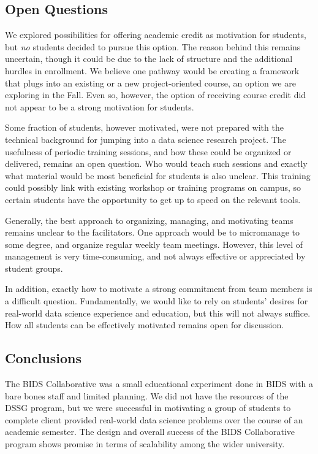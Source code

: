 \documentclass{sig-alternate}
\begin{document}
\subsection{Open Questions}

We explored possibilities for offering academic credit as motivation for students, but \emph{no} students decided to pursue this option. The reason behind this remains uncertain, though it could be due to the lack of structure and the additional hurdles in enrollment. We believe one pathway would be creating a framework that plugs into an existing or a new project-oriented course, an option we are exploring in the Fall.  Even so, however, the option of receiving course credit did not appear to be a strong motivation for students.

Some fraction of students, however motivated, were not prepared with the technical background for jumping into a data science research project.  The usefulness of periodic training sessions, and how these could be organized or delivered, remains an open question.  Who would teach such sessions and exactly what material would be most beneficial for students is also unclear.  This training could possibly link with existing workshop or training programs on campus, so certain students have the opportunity to get up to speed on the relevant tools.

Generally, the best approach to organizing, managing, and motivating teams remains unclear to the facilitators.  One approach would be to micromanage to some degree, and organize regular weekly team meetings.  However, this level of management is very time-consuming, and not always effective or appreciated by student groups.

In addition, exactly how to motivate a strong commitment from team members is a difficult question.  Fundamentally, we would like to rely on students' desires for real-world data science experience and education, but this will not always suffice.  How all students can be effectively motivated remains open for discussion.

\subsection{Conclusions}

The BIDS Collaborative was a small educational experiment done in BIDS with a bare bones staff and limited planning. We did not have the resources of the DSSG program, but we were successful in motivating a group of students to complete client provided real-world data science problems over the course of an academic semester.  The design and overall success of the BIDS Collaborative program shows promise in terms of scalability among the wider university.
\end{document}

